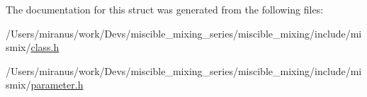 The documentation for this struct was generated from the following files\+:\begin{DoxyCompactItemize}
\item 
/\+Users/miranus/work/\+Devs/miscible\+\_\+mixing\+\_\+series/miscible\+\_\+mixing/include/mismix/\hyperlink{class_8h}{class.\+h}\item 
/\+Users/miranus/work/\+Devs/miscible\+\_\+mixing\+\_\+series/miscible\+\_\+mixing/include/mismix/\hyperlink{parameter_8h}{parameter.\+h}\end{DoxyCompactItemize}
